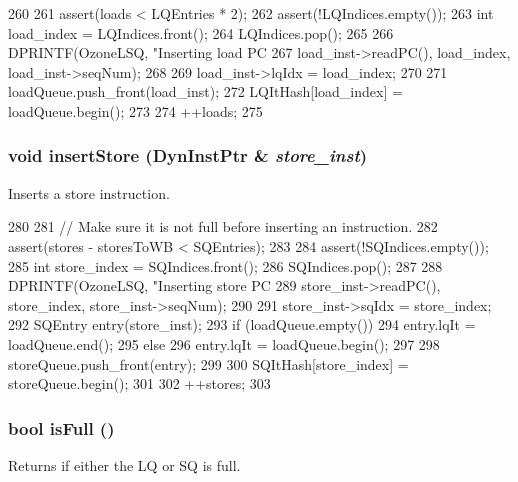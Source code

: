 \begin{DoxyCode}
260 {
261     assert(loads < LQEntries * 2);
262     assert(!LQIndices.empty());
263     int load_index = LQIndices.front();
264     LQIndices.pop();
265 
266     DPRINTF(OzoneLSQ, "Inserting load PC %
267             load_inst->readPC(), load_index, load_inst->seqNum);
268 
269     load_inst->lqIdx = load_index;
270 
271     loadQueue.push_front(load_inst);
272     LQItHash[load_index] = loadQueue.begin();
273 
274     ++loads;
275 }
\end{DoxyCode}
\hypertarget{classOzoneLWLSQ_a6a4b4e51bfff3639932ebaba45e8a282}{
\subsubsection[{insertStore}]{\setlength{\rightskip}{0pt plus 5cm}void insertStore ({\bf DynInstPtr} \& {\em store\_\-inst})}}
\label{classOzoneLWLSQ_a6a4b4e51bfff3639932ebaba45e8a282}
Inserts a store instruction. 


\begin{DoxyCode}
280 {
281     // Make sure it is not full before inserting an instruction.
282     assert(stores - storesToWB < SQEntries);
283 
284     assert(!SQIndices.empty());
285     int store_index = SQIndices.front();
286     SQIndices.pop();
287 
288     DPRINTF(OzoneLSQ, "Inserting store PC %
289             store_inst->readPC(), store_index, store_inst->seqNum);
290 
291     store_inst->sqIdx = store_index;
292     SQEntry entry(store_inst);
293     if (loadQueue.empty()) {
294         entry.lqIt = loadQueue.end();
295     } else {
296         entry.lqIt = loadQueue.begin();
297     }
298     storeQueue.push_front(entry);
299 
300     SQItHash[store_index] = storeQueue.begin();
301 
302     ++stores;
303 }
\end{DoxyCode}
\hypertarget{classOzoneLWLSQ_a3e70330939fdfc4dbc2f60c1a660584d}{
\subsubsection[{isFull}]{\setlength{\rightskip}{0pt plus 5cm}bool isFull ()}}
\label{classOzoneLWLSQ_a3e70330939fdfc4dbc2f60c1a660584d}
Returns if either the LQ or SQ is full. 


